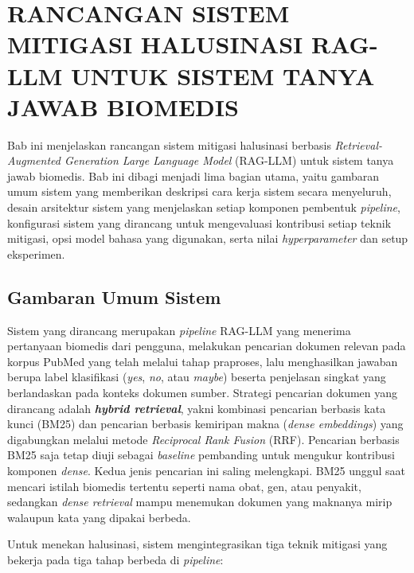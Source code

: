 \chapter{RANCANGAN SISTEM MITIGASI HALUSINASI RAG-LLM UNTUK SISTEM TANYA JAWAB BIOMEDIS}
\label{chap:perancangan}

Bab ini menjelaskan rancangan sistem mitigasi halusinasi berbasis \textit{Retrieval-Augmented Generation Large Language Model} (RAG-LLM) untuk sistem tanya jawab biomedis. Bab ini dibagi menjadi lima bagian utama, yaitu gambaran umum sistem yang memberikan deskripsi cara kerja sistem secara menyeluruh, desain arsitektur sistem yang menjelaskan setiap komponen pembentuk \textit{pipeline}, konfigurasi sistem yang dirancang untuk mengevaluasi kontribusi setiap teknik mitigasi, opsi model bahasa yang digunakan, serta nilai \textit{hyperparameter} dan setup eksperimen.

\section{Gambaran Umum Sistem}
\label{sec:gambaran-umum-sistem}

Sistem yang dirancang merupakan \textit{pipeline} RAG-LLM yang menerima pertanyaan biomedis dari pengguna, melakukan pencarian dokumen relevan pada korpus PubMed yang telah melalui tahap praproses, lalu menghasilkan jawaban berupa label klasifikasi (\textit{yes}, \textit{no}, atau \textit{maybe}) beserta penjelasan singkat yang berlandaskan pada konteks dokumen sumber. Strategi pencarian dokumen yang dirancang adalah \textbf{\textit{hybrid retrieval}}, yakni kombinasi pencarian berbasis kata kunci (BM25) dan pencarian berbasis kemiripan makna (\textit{dense embeddings}) yang digabungkan melalui metode \textit{Reciprocal Rank Fusion} (RRF). Pencarian berbasis BM25 saja tetap diuji sebagai \textit{baseline} pembanding untuk mengukur kontribusi komponen \textit{dense}. Kedua jenis pencarian ini saling melengkapi. BM25 unggul saat mencari istilah biomedis tertentu seperti nama obat, gen, atau penyakit, sedangkan \textit{dense retrieval} mampu menemukan dokumen yang maknanya mirip walaupun kata yang dipakai berbeda.

Untuk menekan halusinasi, sistem mengintegrasikan tiga teknik mitigasi yang bekerja pada tiga tahap berbeda di \textit{pipeline}:

